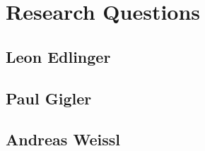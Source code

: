 \Author{\daAuthorTwo} %

\section{Research Questions}

\subsection{Leon Edlinger}

\subsection{Paul Gigler}

\subsection{Andreas Weissl}